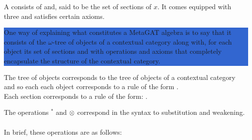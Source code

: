 \documentclass[10pt,a4paper]{article}
\newcommand{\highlightpara}[1]{\colorbox{highlight}{%
    \parbox{\dimexpr\linewidth-2\fboxsep}%
        {#1}}
}
\begin{document}
  
A  consists of  and, 
said to be the set of sections of $x$.
It comes equipped with three  and   
satisfies certain axioms.

\noindent
\highlightpara{One way of explaining what constitutes a  MetaGAT algebra is to say that it consists of the $\omega$-tree of objects of a contextual category along with, for each object 
its set of sections  and with operations and axioms that completely encapsulate the structure of the contextual category.} 

The tree of objects corresponds to the tree of objects of a contextual category and so each each object corresponds to  a rule of the form
. \\
Each  section corresponds to a rule of the form:
 .


\vspace{1cm}
The  operations $^*$ and $\underset{}{\otimes}$  
 correspond in the syntax to  substitution and  weakening. 

In brief, these operations are as follows:
\end{document}
